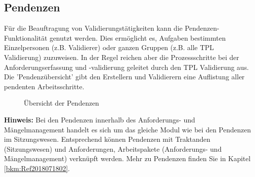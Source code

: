 \subsection{Pendenzen}

Für die Beauftragung von Validierungstätigkeiten kann die Pendenzen-Funktionalität genutzt werden. Dies ermöglicht es, Aufgaben bestimmten Einzelpersonen (z.B. Validierer) oder ganzen Gruppen (z.B. alle TPL Validierung) zuzuweisen. In der Regel reichen aber die Prozessschritte bei der Anforderungserfassung und -validierung geleitet durch den TPL Validierung aus. Die 'Pendenzübersicht' gibt den Erstellern und Validierern eine Auflistung aller pendenten Arbeitsschritte. 

\begin{figure}[H]
\caption{Übersicht der Pendenzen}
\end{figure}

\textbf{Hinweis:} Bei den Pendenzen innerhalb des Anforderungs- und Mängelmanagement handelt es sich um das gleiche Modul wie bei den Pendenzen im Sitzungswesen. Entsprechend können Pendenzen mit Traktanden (Sitzungswesen) und Anforderungen, Arbeitspakete (Anforderungs- und Mängelmanagement) verknüpft werden. Mehr zu Pendenzen finden Sie in Kapitel \ref{bkm:Ref2018071802}.







